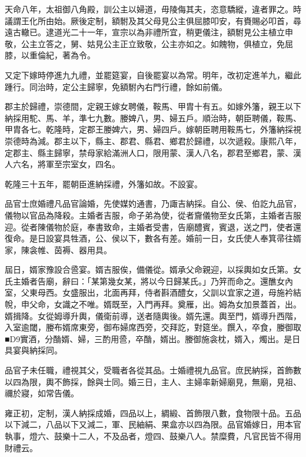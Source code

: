 \begin{pinyinscope}
天命八年，太祖御八角殿，訓公主以婦道，毋陵侮其夫，恣意驕縱，違者罪之。時議謂王化所由始。厥後定制，額駙及其父母見公主俱屈膝叩安，有賚賜必叩首，尋遠古轍已。逮道光二十一年，宣宗以為非禮所宜，稍更儀注，額駙見公主植立申敬，公主立答之，舅、姑見公主正立致敬，公主亦如之。如餽物，俱植立，免屈膝，以重倫紀，著為令。

又定下嫁時停進九九禮，並罷筵宴，自後罷宴以為常。明年，改初定進羊九，繼此踵行。同治時，定公主歸寧，免額駙內右門行禮，餘如前儀。

郡主於歸禮，崇德間，定親王嫁女聘儀，鞍馬、甲胄十有五。如嫁外籓，親王以下納採用駝、馬、羊，準七九數。媵婢八，男、婦五戶。順治時，朝臣聘儀，鞍馬、甲胄各七。乾隆時，定郡王媵婢六，男、婦四戶。嫁朝臣聘用鞍馬七，外籓納採視崇德時為減。郡主以下，縣主、郡君、縣君、鄉君於歸禮，以次遞殺。康熙八年，定郡主、縣主歸寧，禁母家給滿洲人口，限用蒙、漢人八名，郡君至鄉君，蒙、漢人六名，將軍至宗室女，四名。

乾隆三十五年，罷朝臣進納採禮，外籓如故。不設宴。

品官士庶婚禮凡品官論婚，先使媒妁通書，乃諏吉納採。自公、侯、伯訖九品官，儀物以官品為降殺。主婚者吉服，命子弟為使，從者齎儀物至女氏第，主婚者吉服迎。從者陳儀物於庭，奉書致命，主婚者受書，告廟醴賓，賓退，送之門，使者還復命。是日設宴具牲酒，公、侯以下，數各有差。婚前一日，女氏使人奉箕帚往婿家，陳衾帷、茵褥、器用具。

屆日，婿家豫設合巹宴。婿吉服俟，備儀從。婿承父命親迎，以採輿如女氏第。女氏主婚者告廟，辭曰：「某第幾女某，將以今日歸某氏。」乃笄而命之。還醮女內室，父東母西。女盛服出，北面再拜，侍者斟酒醴女，父訓以宜家之道，母施衿結帨，申父命，女識之不唯。婿既至，入門再拜。奠雁，出。姆為女加景蓋首，出。婿揖降。女從姆導升輿，儀衛前導，送者隨輿後。婿先還。輿至門，婿導升西階，入室逾閾，媵布婿席東旁，御布婦席西旁，交拜訖，對筵坐。饌入，卒食，媵御取■D9實酒，分酳婿、婦，三酌用巹，卒酳，婿出。媵御施衾枕，婿入，燭出。是日具宴與納採同。

品官子未任職，禮視其父，受職者各從其品。士婚禮視九品官。庶民納採，首飾數以四為限，輿不飾採，餘與士同。婚三日，主人、主婦率新婦廟見，無廟，見祖、禰於寢，如常告儀。

雍正初，定制，漢人納採成婚，四品以上，綢緞、首飾限八數，食物限十品。五品以下減二，八品以下又減二，軍、民紬絹、果盒亦以四為限。品官婚嫁日，用本官執事，燈六、鼓樂十二人，不及品者，燈四、鼓樂八人。禁糜費，凡官民皆不得用財禮云。


\end{pinyinscope}

